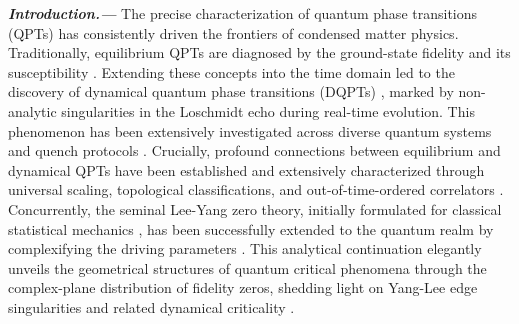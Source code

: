 \documentclass[aps,prb,floatfix,superscriptaddress,reprint]{revtex4-2}
\begin{document}
\maketitle

\noindent \textbf{\textit{Introduction.---}} The precise characterization of quantum phase transitions (QPTs) has consistently driven the frontiers of condensed matter physics. Traditionally, equilibrium QPTs are diagnosed by the ground-state fidelity and its susceptibility \cite{GuSJ2008,Gu2010, ZengChen2024}. Extending these concepts into the time domain led to the discovery of dynamical quantum phase transitions (DQPTs) \cite{Heyl2013, HeylM2018}, marked by non-analytic singularities in the Loschmidt echo during real-time evolution. This phenomenon has been extensively investigated across diverse quantum systems and quench protocols \cite{Sehrawat2021,Banuls2025, Zeng2023b,ZYZheng2026}. Crucially, profound connections between equilibrium and dynamical QPTs have been established and extensively characterized through universal scaling, topological classifications, and out-of-time-ordered correlators \cite{Ding2020,Vajna2015, Zeng2025a, Salasnich2026,Heyl2018, Nie2020, Zhang2011}. Concurrently, the seminal Lee-Yang zero theory, initially formulated for classical statistical mechanics \cite{Yang1952, Lee1952, Biskup2000}, has been successfully extended to the quantum realm by complexifying the driving parameters \cite{Tong2006a, Kist2021, Vecsei2022, Vecsei2023, Li2023, Liu2024, LiuZou2024, Wang2024, Vecsei2025, Li2025_1, Meng2025, He2025, Lv2026, Guo2026}. This analytical continuation elegantly unveils the geometrical structures of quantum critical phenomena through the complex-plane distribution of fidelity zeros, shedding light on Yang-Lee edge singularities and related dynamical criticality \cite{LuSunGY2025, ZouCPL2023, Xu2025,ZhangYouLW2025}.
\end{document}
